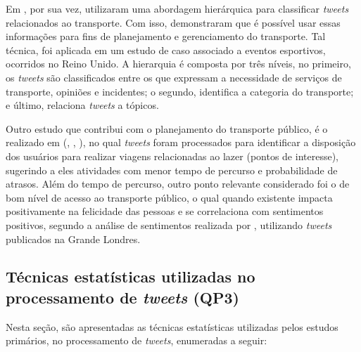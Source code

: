 \documentclass[
	12pt,				%
	oneside,			%
	a4paper,			%
	english,			%
	brazil				%
	]{abntex2ppgsi}
\begin{document}
{{{Em \cite{Gal-Tzur2014}, por sua vez, utilizaram uma abordagem hierárquica para classificar \textit{tweets} relacionados ao transporte. Com isso, demonstraram que é possível usar essas informações para fins de planejamento e gerenciamento do transporte. Tal técnica, foi aplicada em um estudo de caso associado a eventos esportivos, ocorridos no Reino Unido. A hierarquia é composta por três níveis, no primeiro, os \textit{tweets} são classificados entre os que expressam a necessidade de serviços de transporte, opiniões e incidentes; o segundo, identifica a categoria do transporte; e último, relaciona \textit{tweets} a tópicos. 

Outro estudo que contribui com o planejamento do transporte público, é o realizado em (\citeauthor{Gkiotsalitis2015}, \citeyear{Gkiotsalitis2015}, \citeyear{Gkiotsalitis2016}), no qual \textit{tweets} foram processados para identificar a disposição dos usuários para realizar viagens relacionadas ao lazer (pontos de interesse), sugerindo a eles atividades com menor tempo de percurso e probabilidade de atrasos. Além do tempo de percurso, outro ponto relevante considerado foi o de bom nível de acesso ao transporte público, o qual quando existente impacta positivamente na felicidade das pessoas e se correlaciona com sentimentos positivos, segundo a análise de sentimentos realizada por \cite{Guo2016}, utilizando \textit{tweets} publicados na Grande Londres.

\subsection{Técnicas estatísticas utilizadas no processamento de \textit{tweets} (QP3)}
Nesta seção, são apresentadas as técnicas estatísticas utilizadas pelos estudos primários, no processamento de \textit{tweets}, enumeradas a seguir:

}}}
\end{document}
